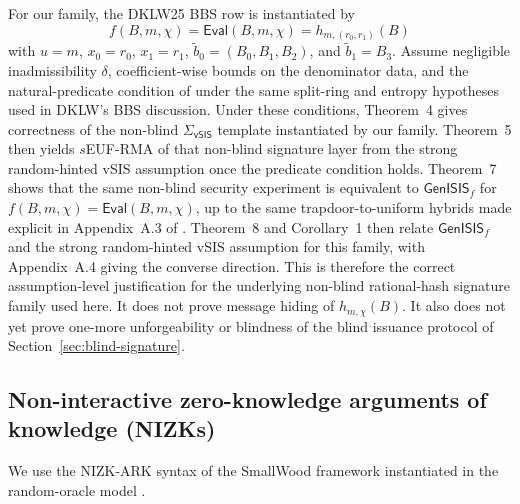\begin{remark}\label{rem:vsis-unforgeability}
For our family, the DKLW25 BBS row is instantiated by
\[
  f(B,m,\chi)=\mathsf{Eval}(B,m,\chi)=h_{m,(r_0,r_1)}(B)
\]
with \(u=m\), \(x_0=r_0\), \(x_1=r_1\), \(\tilde b_0=(B_0,B_1,B_2)\), and \(\tilde b_1=B_3\). Assume negligible
inadmissibility \(\delta\), coefficient-wise bounds on the denominator data, and the natural-predicate condition of
\cite[Definition~7]{EPRINT:DKLW25} under the same split-ring and entropy hypotheses used in DKLW's BBS discussion.
Under these conditions, Theorem~4 gives correctness of the non-blind \(\Sigma_{\mathsf{vSIS}}\) template instantiated by
our family. Theorem~5 then yields \(s\)EUF-RMA of that non-blind signature layer from the strong random-hinted vSIS
assumption once the predicate condition holds. Theorem~7 shows that the same non-blind security experiment is equivalent
to \(\mathsf{GenISIS}_f\) for \(f(B,m,\chi)=\mathsf{Eval}(B,m,\chi)\), up to the same trapdoor-to-uniform hybrids made
explicit in Appendix~A.3 of \cite{EPRINT:DKLW25}. Theorem~8 and Corollary~1 then relate \(\mathsf{GenISIS}_f\) and the
strong random-hinted vSIS assumption for this family, with Appendix~A.4 giving the converse direction. This is
therefore the correct assumption-level justification for the underlying non-blind rational-hash signature family used
here. It does not prove message hiding of \(h_{m,\chi}(B)\). It also does not yet prove one-more unforgeability or
blindness of the blind issuance protocol of Section~\ref{sec:blind-signature}.
\end{remark}

\subsection{Non-interactive zero-knowledge arguments of knowledge (NIZKs)}
\label{subsec:prelim-nizk}
\label{subsec:nizk-ark}
We use the NIZK-ARK syntax of the SmallWood framework instantiated in the random-oracle model
\cite[Definition~3]{EPRINT:FenRiv25b}.

